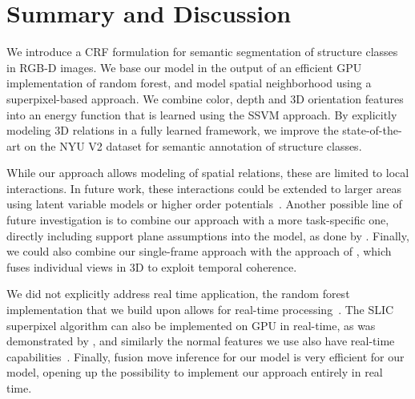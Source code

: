 \section{Summary and Discussion}
We introduce a CRF formulation for semantic segmentation
of structure classes in \mbox{RGB-D} images. We base our model in the output of an efficient GPU implementation
of random forest, and model spatial neighborhood using a superpixel-based approach.
We combine color, depth and 3D orientation features into an energy function
that is learned using the SSVM approach. By explicitly modeling 3D relations in
a fully learned framework, we improve the state-of-the-art on the NYU V2
dataset for semantic annotation of structure classes.


While our approach allows modeling of spatial relations, these are limited to
local interactions. In future work, these interactions could be extended to
larger areas using latent variable models or higher
order potentials~\citep{ladicky2009associative}.
Another possible line of future investigation is to combine our approach with a more
task-specific one, directly including support plane assumptions into the model,
as done by \citet{SilbermanECCV12}. Finally, we could also combine our
single-frame approach with the approach of \citet{stueckler2013}, which fuses
individual views in 3D to exploit temporal coherence.

We did not explicitly address real time application, the random
forest implementation that we build upon allows for real-time
processing~\citep{stueckler2013}. The SLIC superpixel algorithm can also be
implemented on GPU in real-time, as was demonstrated by \citep{ren2011gslic}, and similarly
the normal features we use also have
real-time capabilities~\citep{holz_2011_robocup}.
Finally, fusion move inference for our model is very efficient for our model,
opening up the possibility to implement our approach entirely in real time.
